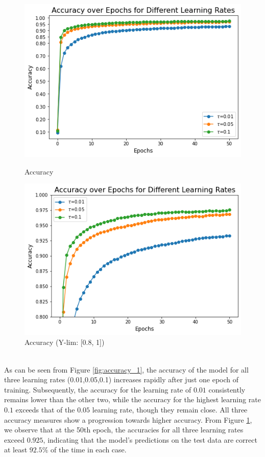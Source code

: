 \begin{figure}[h!]
    \centering
    \begin{minipage}[b]{0.45\textwidth}
      \includegraphics[width=\textwidth]{Pictures/Accuracy_over_epochs_lr.png}
      \caption{Accuracy}\label{fig:accuracy_1}
    \end{minipage}
    \hspace{0.3cm}
    \begin{minipage}[b]{0.45\textwidth}
      \includegraphics[width=\textwidth]{Pictures/Accuracy_over_epochs_lr_zoom.png}
      \caption{Accuracy (Y-lim: [0.8, 1])}\label{fig:accuracy_2}
    \end{minipage}
\end{figure}\\
As can be seen from Figure \ref{fig:accuracy_1}, the accuracy of the model for all three learning rates (0.01,\text{ }0.05,\text{ }0.1) increases rapidly after just one epoch of training. Subsequently, the accuracy for the learning rate of $0.01$ consistently remains lower than the other two, while the accuracy for the highest learning rate $0.1$ exceeds that of the $0.05$ learning rate, though they remain close. All three accuracy measures show a progression towards higher accuracy. From Figure \ref{fig:accuracy_2}, we observe that at the 50th epoch, the accuracies for all three learning rates exceed $0.925$, indicating that the model's predictions on the test data are correct at least $92.5\%$ of the time in each case.
